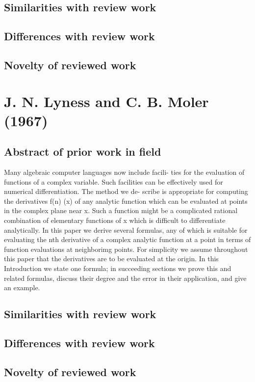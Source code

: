 \documentclass[10pt,letterpaper,draft]{article}
\begin{document}
\subsection{Similarities with review work}
\subsection{Differences with review work}
\subsection{Novelty of reviewed work}


\section{J. N. Lyness and C. B. Moler (1967)}
\subsection{Abstract of prior work in field}

Many algebraic computer languages now include facili- ties for the evaluation
of functions of a complex variable. Such facilities can be effectively used for
numerical differentiation. The method we de- scribe is appropriate for
computing the derivatives f(n) (x) of any analytic function which can be
evaluated at points in the complex plane near x.  Such a function might be a
complicated rational combination of elementary functions of x which is
difficult to differentiate analytically.  In this paper we derive several
formulas, any of which is suitable for evaluating the nth derivative of a
complex analytic function at a point in terms of function evaluations at
neighborimg points. For simplicity we assume throughout this paper that the
derivatives are to be evaluated at the origin. In this Introduction we state
one formula; in succeeding sections we prove this and related formulas, discuss
their degree and the error in their application, and give an example.

\subsection{Similarities with review work}
\subsection{Differences with review work}
\subsection{Novelty of reviewed work}
\end{document}
